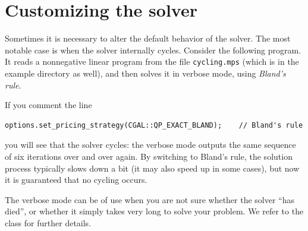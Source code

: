 \section{Customizing the solver}
\label{sec:QP-customization}
Sometimes it is necessary to alter the default behavior of the solver.
The most notable case is when the solver internally cycles. Consider
the following program. It reads a nonnegative linear program from the
file \texttt{cycling.mps} (which is in the example directory as well),
and then solves it in verbose mode, using \emph{Bland's rule}.


If you comment the line 
\begin{verbatim}
options.set_pricing_strategy(CGAL::QP_EXACT_BLAND);    // Bland's rule
\end{verbatim}
you will see that the solver cycles: the verbose mode outputs the same
sequence of six iterations over and over again. By switching to 
Bland's rule, the solution process typically slows down a bit 
(it may also speed up in some cases), but now it is guaranteed that
no cycling occurs.

The verbose mode can be of use when you are not sure whether the
solver ``has died'', or whether it simply takes very long to solve
your problem.  We refer to the class 
for further details.
